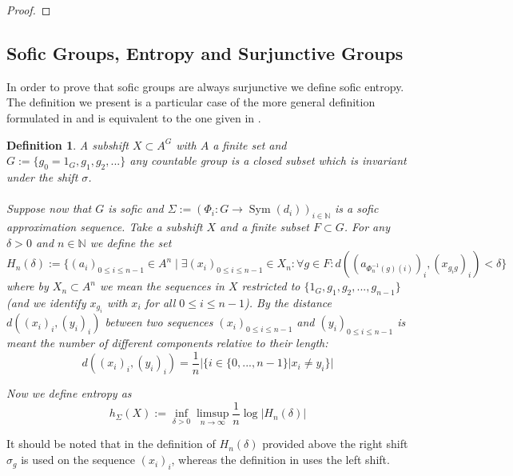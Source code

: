 \documentclass[titlepage, a4paper]{article}
\newcommand{\N}{\mathbb{N}}
\DeclareMathOperator{\sym}{Sym}
\theoremstyle{theoremdd}
\theoremstyle{definitiondd}
\newtheorem{definition}[theorem]{Definition}
\theoremstyle{remarkdd}
\begin{document}
\begin{proof}
\end{proof}


\subsection{Sofic Groups, Entropy and Surjunctive Groups}\label{ssec:sofic_surjunctive}

In order to prove that sofic groups are always surjunctive we define sofic entropy. The definition we present is a particular case of the more general definition formulated in \cite[paragraph 2.13.6]{capraro_lupini_2015} and is equivalent to the one given in \cite[definition 4.2]{kerr_li_2010}. 

\begin{definition}

A subshift $X \subset A^G$ with $A$ a finite set and $G := \{g_0 = 1_G, g_1, g_2, ...\}$ any countable group is a closed subset which is invariant under the shift $\sigma$.\\
\\
Suppose now that $G$ is sofic and $\Sigma := (\Phi_i: G \to \sym(d_i))_{i \in \N}$ is a sofic approximation sequence. Take a subshift $X$ and a finite subset $F \subset G$. For any $\delta > 0$ and $n \in \N$ we define the set 
		\[
		H_n (\delta) := \{(a_i)_{0 \leq i \leq n-1} \in A^n \mid 
						\exists (x_i)_{0 \leq i \leq n-1} \in X_n : 
						\forall g \in F: d((a_{\Phi^{-1}_n(g)(i)})_i,(x_{ g_i g})_i) < \delta \}
		\]
		where by $X_n \subset A^n$ we mean the sequences in $X$ restricted to $\{1_G, g_1, g_2, ..., g_{n-1}\}$ (and we identify $x_{g_i}$ with $x_i$ for all $0 \leq i \leq n-1$). By the distance $d((x_i)_i, (y_i)_i)$ between two sequences $(x_i)_{0 \leq i \leq n-1}$ and $(y_i)_{0 \leq i \leq n-1}$ is meant the number of different components relative to their length:
		\[
		d((x_i)_i, (y_i)_i) = \frac{1}{n} |\{i \in \{0, ..., n-1\}|x_i \neq y_i\}|
		\]
				

		Now we define entropy as 
		\[
		h_\Sigma(X) := \inf_{\delta>0} \limsup_{n \to \infty} \frac{1}{n} \log |H_n(\delta)|
		\]
\end{definition}

It should be noted that in the definition of $H_n(\delta)$ provided above the right shift $\sigma_g$ is used on the sequence $(x_i)_i$, whereas the definition in \cite[paragraph 2.13.6]{capraro_lupini_2015} uses the left shift.\\
\end{document}
